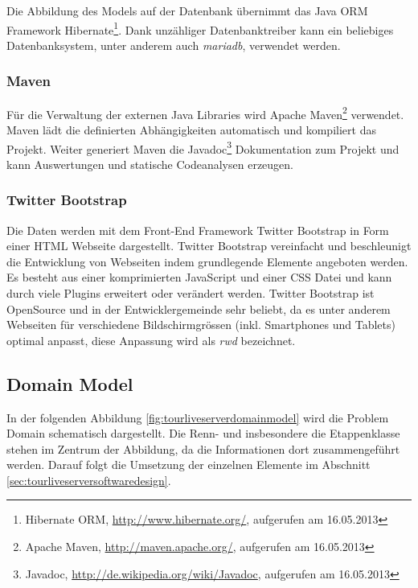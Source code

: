 Die Abbildung des Models auf der Datenbank übernimmt das Java ORM Framework Hibernate\footnote{Hibernate ORM, \url{http://www.hibernate.org/}, aufgerufen am 16.05.2013}. Dank unzähliger Datenbanktreiber kann ein beliebiges Datenbanksystem, unter anderem auch \textit{\gls{mariadb}}, verwendet werden.

\subsubsection{Maven}
Für die Verwaltung der externen Java Libraries wird Apache Maven\footnote{Apache Maven, \url{http://maven.apache.org/}, aufgerufen am 16.05.2013} verwendet. Maven lädt die definierten Abhängigkeiten automatisch und kompiliert das Projekt. Weiter generiert Maven die Javadoc\footnote{Javadoc, \url{http://de.wikipedia.org/wiki/Javadoc}, aufgerufen am 16.05.2013} Dokumentation zum Projekt und kann Auswertungen und statische Codeanalysen erzeugen.

\subsubsection{Twitter Bootstrap}
Die Daten werden mit dem Front-End Framework Twitter Bootstrap in Form einer HTML Webseite dargestellt. Twitter Bootstrap vereinfacht und beschleunigt die Entwicklung von Webseiten indem grundlegende Elemente angeboten werden. Es besteht aus einer komprimierten JavaScript und einer CSS Datei und kann durch viele Plugins erweitert oder verändert werden. Twitter Bootstrap ist OpenSource und in der Entwicklergemeinde sehr beliebt, da es unter anderem Webseiten für verschiedene Bildschirmgrössen (inkl. Smartphones und Tablets) optimal anpasst, diese Anpassung wird als \textit{\gls{rwd}} bezeichnet.

\subsection{Domain Model}
In der folgenden Abbildung \ref{fig:tourliveserverdomainmodel} wird die Problem Domain schematisch dargestellt. Die Renn- und insbesondere die Etappenklasse stehen im Zentrum der Abbildung, da die Informationen dort zusammengeführt werden. Darauf folgt die Umsetzung der einzelnen Elemente im Abschnitt \ref{sec:tourliveserversoftwaredesign}.

